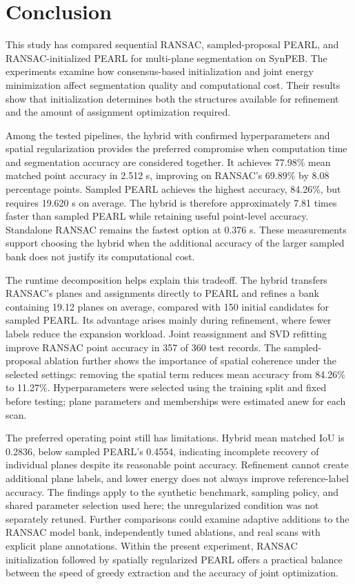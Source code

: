\section{Conclusion}\label{conclusion}

This study has compared sequential RANSAC, sampled-proposal PEARL, and RANSAC-initialized PEARL for multi-plane segmentation on SynPEB. The experiments examine how consensus-based initialization and joint energy minimization affect segmentation quality and computational cost. Their results show that initialization determines both the structures available for refinement and the amount of assignment optimization required.

Among the tested pipelines, the hybrid with confirmed hyperparameters and spatial regularization provides the preferred compromise when computation time and segmentation accuracy are considered together. It achieves 77.98\% mean matched point accuracy in 2.512 s, improving on RANSAC's 69.89\% by 8.08 percentage points. Sampled PEARL achieves the highest accuracy, 84.26\%, but requires 19.620 s on average. The hybrid is therefore approximately 7.81 times faster than sampled PEARL while retaining useful point-level accuracy. Standalone RANSAC remains the fastest option at 0.376 s. These measurements support choosing the hybrid when the additional accuracy of the larger sampled bank does not justify its computational cost.

The runtime decomposition helps explain this tradeoff. The hybrid transfers RANSAC's planes and assignments directly to PEARL and refines a bank containing 19.12 planes on average, compared with 150 initial candidates for sampled PEARL. Its advantage arises mainly during refinement, where fewer labels reduce the expansion workload. Joint reassignment and SVD refitting improve RANSAC point accuracy in 357 of 360 test records. The sampled-proposal ablation further shows the importance of spatial coherence under the selected settings: removing the spatial term reduces mean accuracy from 84.26\% to 11.27\%. Hyperparameters were selected using the training split and fixed before testing; plane parameters and memberships were estimated anew for each scan.

The preferred operating point still has limitations. Hybrid mean matched IoU is 0.2836, below sampled PEARL's 0.4554, indicating incomplete recovery of individual planes despite its reasonable point accuracy. Refinement cannot create additional plane labels, and lower energy does not always improve reference-label accuracy. The findings apply to the synthetic benchmark, sampling policy, and shared parameter selection used here; the unregularized condition was not separately retuned. Further comparisons could examine adaptive additions to the RANSAC model bank, independently tuned ablations, and real scans with explicit plane annotations. Within the present experiment, RANSAC initialization followed by spatially regularized PEARL offers a practical balance between the speed of greedy extraction and the accuracy of joint optimization.
